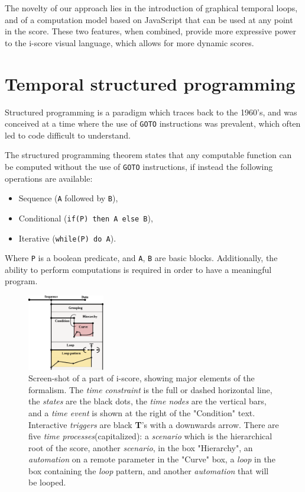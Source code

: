 \documentclass{article}
\newcommand{\scenario}{\textit{scenario}\xspace}
\newcommand{\Loop}{\textit{loop}\xspace}
\newcommand{\states}{\textit{states}\xspace}
\newcommand{\timeevent}{\textit{time event}\xspace}
\newcommand{\timenodes}{\textit{time nodes}\xspace}
\newcommand{\timeconstraint}{\textit{time constraint}\xspace}
\newcommand{\timeprocesses}{\textit{time processes}\xspace}
\newcommand{\automation}{\textit{automation}\xspace}
\newcommand{\triggers}{\textit{triggers}\xspace}
\begin{document}
The novelty of our approach lies in the introduction of graphical temporal loops, and of a computation model 
based on JavaScript that can be used at any point in the score. 
These two features, when combined, provide more expressive power to the i-score visual language, 
which allows for more dynamic scores.

\section{Temporal structured programming}
Structured programming is a paradigm which traces 
back to the 1960's, and was conceived at a time where the use of \lstinline{GOTO}
instructions was prevalent, which often led to code difficult to understand.

The structured programming theorem\cite{bohm1966flow,mills1972mathematical} states that any computable function can be computed 
without the use of \lstinline{GOTO} instructions, if instead the following operations are available: 
\begin{itemize}
    \item Sequence (\lstinline{A} followed by \lstinline{B}), 
    \item Conditional (\lstinline{if(P) then A else B}), 
    \item Iterative (\lstinline{while(P) do A}).
\end{itemize}

Where \lstinline|P| is a boolean predicate, and \lstinline|A|, \lstinline|B| are basic blocks.
Additionally, the ability to perform computations is required in order to have a meaningful program.

\begin{figure}
    \centering
    \includegraphics[width=0.30\textwidth]{images/hierarchy.eps}
    \caption{Screen-shot of a part of i-score, showing major elements of the formalism. The \timeconstraint is the full or dashed horizontal line, the \states are the black dots, the \timenodes are the vertical bars, and a \timeevent is shown at the right of the "Condition" text. Interactive \triggers are black \textbf{T}'s with a downwards arrow. There are five \timeprocesses (capitalized): a \scenario which is the hierarchical root of the score, another \scenario, in the box "Hierarchy", an \automation on a remote parameter in the "Curve" box, a \Loop in the box containing the \Loop pattern, and another \automation that will be looped.}
    \label{fig.hierarchy}
\end{figure}
\end{document}
